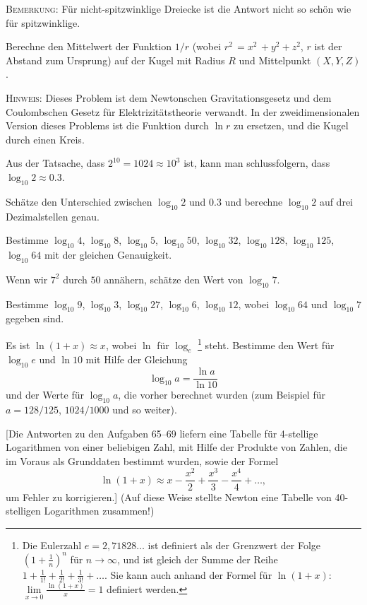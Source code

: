 \documentclass[12pt]{article} %
\begin{document}
\textsc{Bemerkung:} Für nicht-spitzwinklige Dreiecke ist die Antwort nicht so schön wie für spitzwinklige.

\bigskip
{} 
Berechne den Mittelwert der Funktion $1/r$ (wobei $r^2\,=x^2\,+y^2+z^2$, $r$ ist der Abstand zum Ursprung)  auf der Kugel mit Radius $R$ und Mittelpunkt $(X,Y,Z)$.

\medskip
\textsc{Hinweis:} Dieses Problem ist dem Newtonschen Gravitationsgesetz und dem Coulombschen Gesetz für Elektrizitätstheorie verwandt. In der zweidimensionalen Version dieses Problems ist die Funktion durch $\ln r$ zu ersetzen, und die Kugel durch einen Kreis.


\bigskip
{} Aus der Tatsache, dass $2^{10}=1024 \approx 10^3$ ist, kann man schlussfolgern, dass $\log_{10} 2 \approx 0{.}3$.

Schätze den Unterschied zwischen $\log_{10} 2$ und $0{.}3$ und berechne $\log_{10} 2$ auf drei Dezimalstellen genau. 

\bigskip
{} Bestimme $\log_{10} 4$, $\log_{10} 8$,
$\log_{10} 5$, $\log_{10} 50$, $\log_{10} 32$, $\log_{10} 128$,
$\log_{10} 125$, $\log_{10} 64$ mit der gleichen Genauigkeit.

\bigskip
{} Wenn wir $7^2$ durch $50$ annähern, schätze den Wert von $\log_{10} 7$. 

\bigskip
{} Bestimme $\log_{10} 9$, $\log_{10} 3$,
$\log_{10} 27$, $\log_{10} 6$, $\log_{10} 12$, wobei $\log_{10} 64$ und $\log_{10} 7$ gegeben sind.

\bigskip
{} Es ist $\ln (1+x) \approx x$, wobei $\ln$ für $\log_e$ 
\footnote{
Die Eulerzahl $e = 2{,}71828\dots$ ist definiert als der Grenzwert der Folge $\left(1+\frac1n\right)^n$ für $n\to \infty$, und ist gleich der Summe der Reihe 
$1+\frac 1{1!} +\frac 1{2!}+\frac 1{3!}+\dots$. Sie kann auch anhand der Formel für $\ln (1+x)$: $\lim\limits_{x\to 0}\frac{\ln(1+x)}{x} = 1$ definiert werden.}\vspace{-\jot}
steht. Bestimme den Wert für $\log_{10} e$ und $\ln 10$ mit Hilfe der Gleichung 
%
$$
\log_{10} a=\frac{\ln a}{\ln 10}
$$ 
und der Werte für $\log_{10} a$, die vorher berechnet wurden (zum Beispiel für $a=128/125$, $1024/1000$ und so weiter).

[Die Antworten zu den Aufgaben 65--69 liefern eine Tabelle für 4-stellige Logarithmen von einer beliebigen Zahl, mit Hilfe der Produkte von Zahlen, die im Voraus als Grunddaten bestimmt wurden, sowie der Formel 
\vspace{-2\jot}
\[
\ln (1+x) \approx x-\frac{x^2}{2}+\frac{x^3}{3}-\frac{x^4}{4}+\dots,
\]
um Fehler zu korrigieren.] (Auf diese Weise stellte Newton eine Tabelle von 40-stelligen Logarithmen zusammen!)
\end{document}
